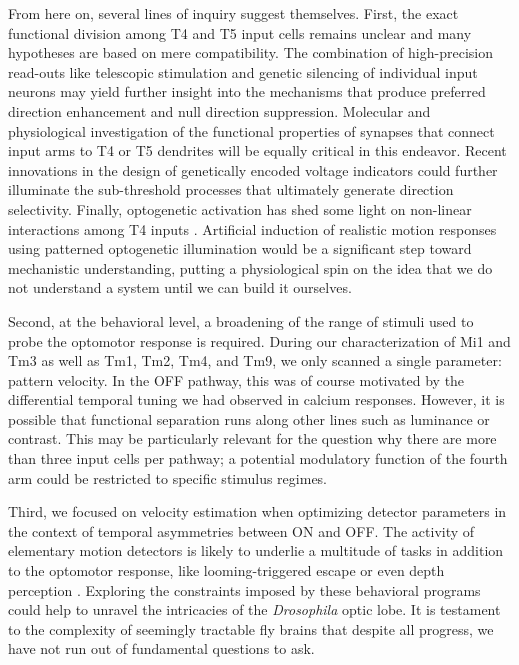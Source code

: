From here on, several lines of inquiry suggest themselves. First, the exact functional division among T4 and T5 input cells remains unclear and many hypotheses are based on mere compatibility. The combination of high-precision read-outs like telescopic stimulation and genetic silencing of individual input neurons may yield further insight into the mechanisms that produce preferred direction enhancement and null direction suppression. Molecular and physiological investigation of the functional properties of synapses that connect input arms to T4 or T5 dendrites will be equally critical in this endeavor. Recent innovations in the design of genetically encoded voltage indicators could further illuminate the sub-threshold processes that ultimately generate direction selectivity. Finally, optogenetic activation has shed some light on non-linear interactions among T4 inputs \citep{Strother:2017aa}. Artificial induction of realistic motion responses using patterned optogenetic illumination would be a significant step toward mechanistic understanding, putting a physiological spin on the idea that we do not understand a system until we can build it ourselves.

Second, at the behavioral level, a broadening of the range of stimuli used to probe the optomotor response is required. During our characterization of Mi1 and Tm3 as well as Tm1, Tm2, Tm4, and Tm9, we only scanned a single parameter: pattern velocity. In the OFF pathway, this was of course motivated by the differential temporal tuning we had observed in calcium responses. However, it is possible that functional separation runs along other lines such as luminance or contrast. This may be particularly relevant for the question why there are more than three input cells per pathway; a potential modulatory function of the fourth arm could be restricted to specific stimulus regimes.

Third, we focused on velocity estimation when optimizing detector parameters in the context of temporal asymmetries between ON and OFF. The activity of elementary motion detectors is likely to underlie a multitude of tasks in addition to the optomotor response, like looming-triggered escape or even depth perception \citep{Schilling:2015jh,Schwegmann:2014ir}. Exploring the constraints imposed by these behavioral programs could help to unravel the intricacies of the \textit{Drosophila} optic lobe. It is testament to the complexity of seemingly tractable fly brains that despite all progress, we have not run out of fundamental questions to ask.